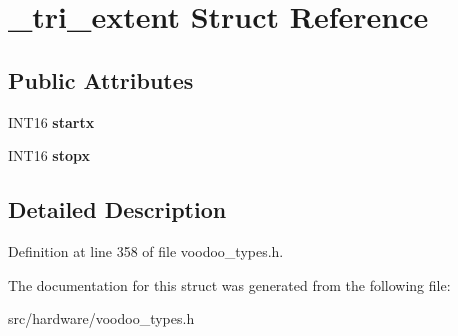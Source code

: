 \hypertarget{struct__tri__extent}{\section{\-\_\-tri\-\_\-extent Struct Reference}
\label{struct__tri__extent}
}
\subsection*{Public Attributes}
\begin{DoxyCompactItemize}
\item 
\hypertarget{struct__tri__extent_a2c707a9bda2f0115a12c3a53c9052003}{I\-N\-T16 {\bfseries startx}}\label{struct__tri__extent_a2c707a9bda2f0115a12c3a53c9052003}

\item 
\hypertarget{struct__tri__extent_aa222c97d69971ca936c10ed592981b7b}{I\-N\-T16 {\bfseries stopx}}\label{struct__tri__extent_aa222c97d69971ca936c10ed592981b7b}

\end{DoxyCompactItemize}


\subsection{Detailed Description}


Definition at line 358 of file voodoo\-\_\-types.\-h.



The documentation for this struct was generated from the following file\-:\begin{DoxyCompactItemize}
\item 
src/hardware/voodoo\-\_\-types.\-h\end{DoxyCompactItemize}
